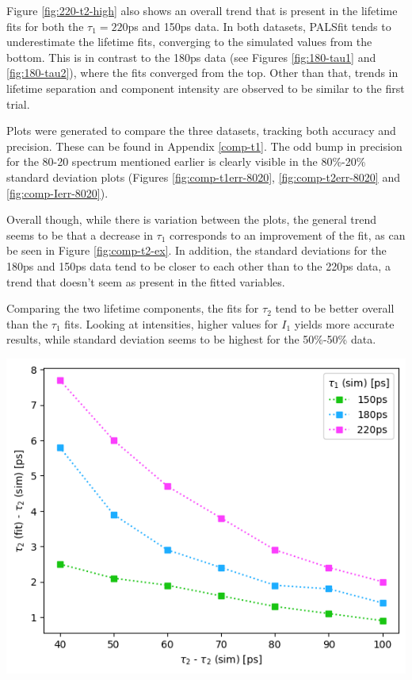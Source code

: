 \vspace{0.5cm}

Figure \ref{fig:220-t2-high} also shows an overall trend that is present in the lifetime fits for both the $\tau_1=220$ps and 150ps data. In both datasets, PALSfit tends to underestimate the lifetime fits, converging to the simulated values from the bottom. This is in contrast to the 180ps data (see Figures \ref{fig:180-tau1} and \ref{fig:180-tau2}), where the fits converged from the top. Other than that, trends in lifetime separation and component intensity are observed to be similar to the first trial.

Plots were generated to compare the three datasets, tracking both accuracy and precision. These can be found in Appendix \ref{comp-t1}. The odd bump in precision for the 80-20 spectrum mentioned earlier is clearly visible in the 80\%-20\% standard deviation plots (Figures \ref{fig:comp-t1err-8020}, \ref{fig:comp-t2err-8020} and \ref{fig:comp-Ierr-8020}). 

Overall though, while there is variation between the plots, the general trend seems to be that a decrease in $\tau_1$ corresponds to an improvement of the fit, as can be seen in Figure \ref{fig:comp-t2-ex}. In addition, the standard deviations for the 180ps and 150ps data tend to be closer to each other than to the 220ps data, a trend that doesn't seem as present in the fitted variables.

Comparing the two lifetime components, the fits for $\tau_2$ tend to be better overall than the $\tau_1$ fits. Looking at intensities, higher values for $I_1$ yields more accurate results, while standard deviation seems to be highest for the 50\%-50\% data.

\vspace{0.5cm}

\begin{minipage}{.9\linewidth}
     
    \includegraphics[width=0.6\linewidth]{Batch 3/regular IRF/t2-diff 5050.png}
    \label{fig:comp-t2-ex}
\end{minipage}

